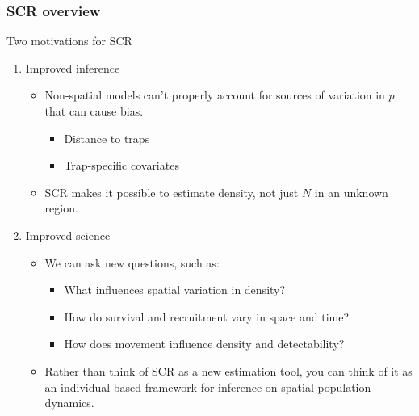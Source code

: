 \documentclass[color=usenames,dvipsnames]{beamer}\usepackage[]{graphicx}\usepackage[]{color}
\begin{document}
\begin{frame}
  \frametitle{SCR overview}
  {\centering Two motivations for SCR \\}
  \vfill
  \begin{enumerate}
    \item Improved inference
    \begin{itemize}
      \item<1-> Non-spatial models can't properly account for sources
        of variation in $p$ that can cause bias.
        \begin{itemize}
          \item<1-> Distance to traps
          \item<1-> Trap-specific covariates
        \end{itemize}
      \item<2-> SCR makes it possible to estimate \alert{density}, not
        just $N$ in an unknown region. 
    \end{itemize}
    \pause
    \vfill
  \item<3-> Improved science
  \begin{itemize}
    \item<3-> We can ask new questions, such as:
      \begin{itemize}
        \item<3-> What influences spatial variation in density?
        \item<4-> How do survival and recruitment vary in space and time?
        \item<5-> How does movement influence density and detectability?
      \end{itemize}
    \item<6-> Rather than think of SCR as a new estimation tool, you
      can think of it as an individual-based framework for inference on
      spatial population dynamics.
    \end{itemize}
  \end{enumerate}
\end{frame}



\end{document}
